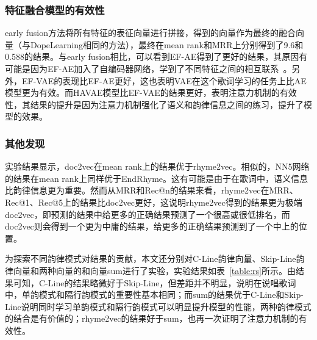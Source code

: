 \subsubsection{特征融合模型的有效性}early fusion方法将所有特征的表征向量进行拼接，得到的向量作为最终的融合向量（与DopeLearning相同的方法），最终在mean rank和MRR上分别得到了9.6和0.588的结果。与early fusion相比，可以看到EF-AE得到了更好的结果，其原因有可能是因为EF-AE加入了自编码器网络，学到了不同特征之间的相互联系~\cite{bengio2009learning}。另外，EF-VAE的表现比EF-AE更好，这也表明VAE在这个歌词学习的任务上比AE模型更为有效。而HAVAE模型比EF-VAE的结果更好，表明注意力机制的有效性，其结果的提升是因为注意力机制强化了语义和韵律信息之间的练习，提升了模型的效果。\par

\subsubsection{其他发现} \label{sssec:other}实验结果显示，doc2vec在mean rank上的结果优于rhyme2vec。相似的，NN5网络的结果在mean rank上同样优于EndRhyme。这有可能是由于在歌词中，语义信息比韵律信息更为重要。然而从MRR和Rec@n的结果来看，rhyme2vec在MRR、Rec@1、Rec@5上的结果比doc2vec更好，这说明rhyme2vec得到的结果更为极端doc2vec，即预测的结果中给更多的正确结果预测了一个很高或很低排名，而doc2vec则会得到一个更为中庸的结果，给更多的正确结果预测到了一个中上的位置。\par

\begin{table}[h]
  \caption{不同韵律模式的性能}
  \centering
    \renewcommand{\arraystretch}{1}
  \label{table:rs}
\end{table}

为探索不同韵律模式对结果的贡献，本文还分别对C-Line韵律向量、Skip-Line韵律向量和两种向量的和向量sum进行了实验，实验结果如表~\ref{table:rs}所示。由结果可知，C-Line的结果略微好于Skip-Line，但差距并不明显，说明在说唱歌词中，单韵模式和隔行韵模式的重要性基本相同；而sum的结果优于C-Line和Skip-Line说明同时学习单韵模式和隔行韵模式可以明显提升模型的性能，两种韵律模式的结合是有价值的；rhyme2vec的结果好于sum，也再一次证明了注意力机制的有效性。\par


